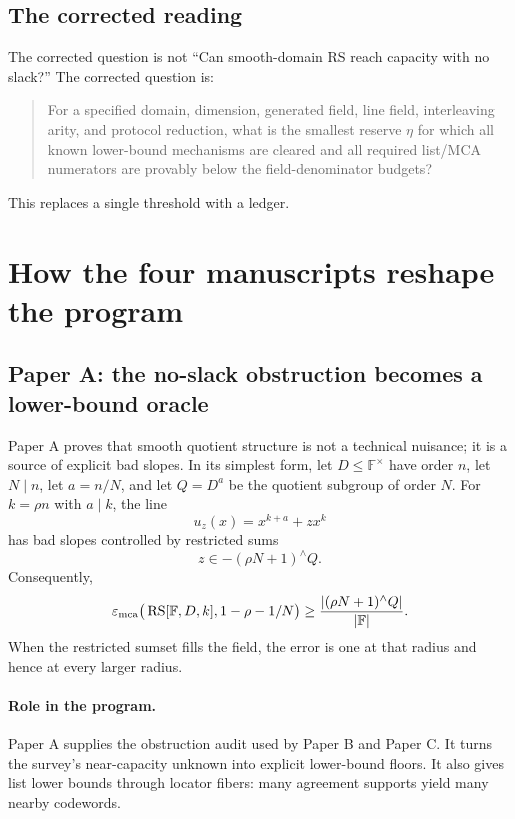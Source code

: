 \documentclass[11pt]{article}
\theoremstyle{definition}
\theoremstyle{remark}
\newcommand{\F}{\mathbb F}
\newcommand{\RS}{\operatorname{RS}}
\newcommand{\emca}{\varepsilon_{\rm mca}}
\newcommand{\paperA}{Paper A}
\newcommand{\paperB}{Paper B}
\newcommand{\paperC}{Paper C}
\begin{document}
\subsection{The corrected reading}

The corrected question is not ``Can smooth-domain RS reach capacity with no slack?''  The corrected question is:

\begin{quote}
For a specified domain, dimension, generated field, line field, interleaving arity, and protocol reduction, what is the smallest reserve $\eta$ for which all known lower-bound mechanisms are cleared and all required list/MCA numerators are provably below the field-denominator budgets?
\end{quote}

This replaces a single threshold with a ledger.

\section{How the four manuscripts reshape the program}

\subsection{\paperA: the no-slack obstruction becomes a lower-bound oracle}

\paperA{} proves that smooth quotient structure is not a technical nuisance; it is a source of explicit bad slopes.  In its simplest form, let $D\le\F^\times$ have order $n$, let $N\mid n$, let $a=n/N$, and let $Q=D^a$ be the quotient subgroup of order $N$.  For $k=\rho n$ with $a\mid k$, the line
\[
        u_z(x)=x^{k+a}+z x^k
\]
has bad slopes controlled by restricted sums
\[
        z\in-(\rho N+1)^{\wedge}Q.
\]
Consequently,
\[
        \emca\big(\RS[\F,D,k],1-\rho-1/N\big)
        \ge \frac{|(\rho N+1)^{\wedge}Q|}{|\F|}.
\]
When the restricted sumset fills the field, the error is one at that radius and hence at every larger radius.

\paragraph{Role in the program.}  \paperA{} supplies the obstruction audit used by \paperB{} and \paperC.  It turns the survey's near-capacity unknown into explicit lower-bound floors.  It also gives list lower bounds through locator fibers: many agreement supports yield many nearby codewords.
\end{document}
